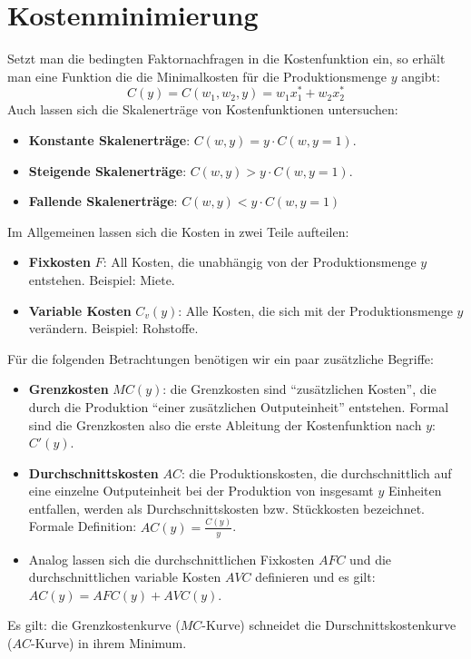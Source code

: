 \section{Kostenminimierung}

Setzt man die bedingten Faktornachfragen in die Kostenfunktion ein, so erhält man eine Funktion die die Minimalkosten für die Produktionsmenge $y$ angibt:
	$$ C(y) = C(w_1, w_2, y) = w_1 x_1^* + w_2 x_2^* $$
Auch lassen sich die Skalenerträge von Kostenfunktionen untersuchen:
\begin{itemize}
	\item \textbf{Konstante Skalenerträge}: $C(w, y) = y \cdot C(w, y = 1)$. 
	\item \textbf{Steigende Skalenerträge}: $C(w, y) > y \cdot C(w, y = 1)$.
	\item \textbf{Fallende Skalenerträge}: $C(w, y) < y \cdot C(w, y = 1)$
\end{itemize}

Im Allgemeinen lassen sich die Kosten in zwei Teile aufteilen:
\begin{itemize}
	\item \textbf{Fixkosten} $F$: All Kosten, die unabhängig von der Produktionsmenge $y$ entstehen. Beispiel: Miete.
	\item \textbf{Variable Kosten} $C_v(y)$: Alle Kosten, die sich mit der Produktionsmenge $y$ verändern. Beispiel: Rohstoffe.
\end{itemize}

Für die folgenden Betrachtungen benötigen wir ein paar zusätzliche Begriffe:
\begin{itemize}
	\item \textbf{Grenzkosten} $MC(y)$: die Grenzkosten sind \enquote{zusätzlichen Kosten}, die durch die Produktion \enquote{einer zusätzlichen Outputeinheit} entstehen. Formal sind die Grenzkosten also die erste Ableitung der Kostenfunktion nach $y$: $C'(y)$.
	\item \textbf{Durchschnittskosten} $AC$: die Produktionskosten, die durchschnittlich auf eine einzelne Outputeinheit bei der Produktion von insgesamt $y$ Einheiten entfallen, werden als Durchschnittskosten bzw. Stückkosten bezeichnet. Formale Definition: $AC(y) = \frac{C(y)}{y}$.
	\item Analog lassen sich die durchschnittlichen Fixkosten $AFC$ und die durchschnittlichen variable Kosten $AVC$ definieren und es gilt: $AC(y) = AFC(y) + AVC(y)$.
\end{itemize}

Es gilt: die Grenzkostenkurve ($MC$-Kurve) schneidet die Durschnittskostenkurve ($AC$-Kurve) in ihrem Minimum.